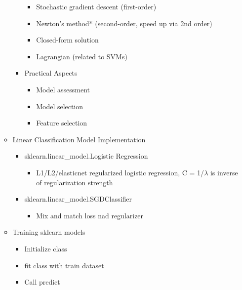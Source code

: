 \documentclass[10pt, oneside]{article}
\begin{document}
\begin{itemize}
\begin{itemize}
\begin{itemize}
            \begin{itemize}
                \item Stochastic gradient descent (first-order)
                \item Newton's method* (second-order, speed up via 2nd order)
                \item Closed-form solution
                \item Lagrangian (related to SVMs)
            \end{itemize}
            \item Practical Aspects
            \begin{itemize}
                \item Model assessment
                \item Model selection
                \item Feature selection
            \end{itemize}
        \end{itemize}
        \item Linear Classification Model Implementation
        \begin{itemize}
            \item sklearn.linear\_model.Logistic Regression
            \begin{itemize}
                \item L1/L2/elasticnet regularized logistic regression, C = 1/$\lambda$ is inverse of regularization strength
            \end{itemize}
            \item sklearn.linear\_model.SGDClassifier
            \begin{itemize}
                \item Mix and match loss nad regularizer
            \end{itemize}
        \end{itemize}
        \item Training sklearn models
        \begin{itemize}
            \item Initialize class
            \item fit class with train dataset
            \item Call predict
        \end{itemize}
    \end{itemize}
\end{itemize}
\end{document}
